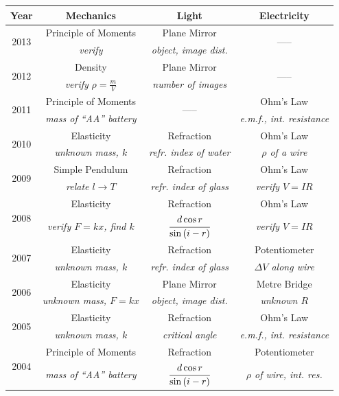 \begin{center}
\begin{tabular}{|c|c|c|c|} \hline
\textbf{Year} & \textbf{Mechanics} & \textbf{Light} & \textbf{Electricity} \\ \hline
\multirow{2}{*}{2013} & Principle of Moments & Plane Mirror & \multirow{2}{*}{-----} \\
& \emph{verify} & \emph{object, image dist.} & \\ \hline
\multirow{2}{*}{2012} & Density & Plane Mirror & \multirow{2}{*}{-----} \\
& \emph{verify} $\rho = \frac{m}{V}$ & \emph{number of images} & \\ \hline
\multirow{2}{*}{2011} & Principle of Moments & \multirow{2}{*}{-----} & Ohm's Law \\
& \emph{mass of ``AA'' battery} & & \emph{e.m.f., int. resistance} \\ \hline
\multirow{2}{*}{2010} & Elasticity & Refraction & Ohm's Law \\
& \emph{unknown mass, $k$} & \emph{refr. index of water} & \emph{$\rho$ of a wire} \\ \hline
\multirow{2}{*}{2009} & Simple Pendulum & Refraction & Ohm's Law \\
& \emph{relate $l \rightarrow T$} & \emph{refr. index of glass} & \emph{verify $V = IR$} \\ \hline
\multirow{2}{*}{2008} & Elasticity & Refraction & Ohm's Law \\
& \emph{verify $F=kx$, find $k$} & \emph{$\cfrac{d\cos{r}}{\sin{(i-r)}}$}  & \emph{verify $V=IR$} \\ \hline
\multirow{2}{*}{2007} & Elasticity & Refraction & Potentiometer \\
& \emph{unknown mass, $k$} & \emph{refr. index of glass} & \emph{$\Delta V$ along wire} \\ \hline
\multirow{2}{*}{2006} & Elasticity & Plane Mirror & Metre Bridge \\
& \emph{unknown mass, $F = kx$} & \emph{object, image dist.} & \emph{unknown $R$} \\ \hline
\multirow{2}{*}{2005} & Elasticity & Refraction & Ohm's Law \\
& \emph{unknown mass, $k$} & \emph{critical angle} & \emph{e.m.f., int. resistance} \\ \hline
\multirow{2}{*}{2004} & Principle of Moments & Refraction & Potentiometer \\
& \emph{mass of ``AA'' battery} & \emph{$\cfrac{d\cos{r}}{\sin{(i-r)}}$} & \emph{$\rho$ of wire, int. res.} \\ \hline
\end{tabular}
\end{center}


